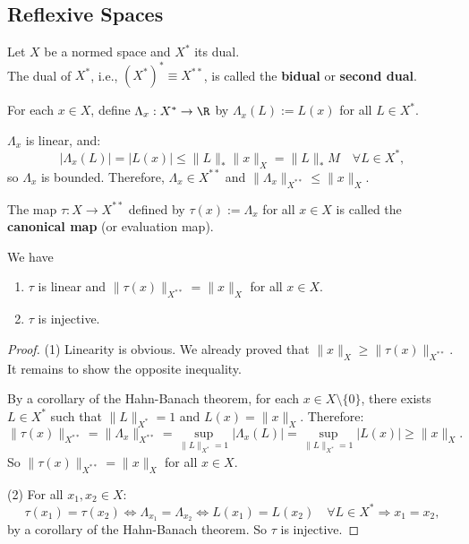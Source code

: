 \subsection{Reflexive Spaces}

\begin{definition}
Let $X$ be a normed space and $X^*$ its dual.\\The dual of $X^*$, i.e., $(X^*)^* \equiv X^{**}$, is called the \textbf{bidual} or \textbf{second dual}.

For each $x \in X$, define $\Lambda_x : X^* \to \R$ by $\Lambda_x(L) := L(x)$ for all $L \in X^*$.

$\Lambda_x$ is linear, and:
\[
|\Lambda_x(L)| = |L(x)| \leq \|L\|_* \|x\|_X = \|L\|_* M \quad \forall L \in X^*,
\]
so $\Lambda_x$ is bounded. Therefore, $\Lambda_x \in X^{**}$ and $\|\Lambda_x\|_{X^{**}} \leq \|x\|_X$.
\end{definition}

\begin{definition}
The map $\tau : X \to X^{**}$ defined by $\tau(x) := \Lambda_x$ for all $x \in X$ is called the \textbf{canonical map} (or evaluation map).
\end{definition}

\clearpage
\begin{theorem} We have

\begin{enumerate}
\item $\tau$ is linear and $\|\tau(x)\|_{X^{**}} = \|x\|_X$ for all $x \in X$.
\item $\tau$ is injective.
\end{enumerate}
\end{theorem}

\begin{proof}
(1) Linearity is obvious. We already proved that $\|x\|_X \geq \|\tau(x)\|_{X^{**}}$. It remains to show the opposite inequality.

By a corollary of the Hahn-Banach theorem, for each $x \in X \setminus \{0\}$, there exists $L \in X^*$ such that $\|L\|_{X^*} = 1$ and $L(x) = \|x\|_X$. Therefore:
\[
\|\tau(x)\|_{X^{**}} = \|\Lambda_x\|_{X^{**}} = \sup_{\|L\|_{X^*} = 1} |\Lambda_x(L)| = \sup_{\|L\|_{X^*} = 1} |L(x)| \geq \|x\|_X.
\]
So $\|\tau(x)\|_{X^{**}} = \|x\|_X$ for all $x \in X$.

(2) For all $x_1, x_2 \in X$:
\[
\tau(x_1) = \tau(x_2) \Leftrightarrow \Lambda_{x_1} = \Lambda_{x_2} \Leftrightarrow L(x_1) = L(x_2) \quad \forall L \in X^* \Rightarrow x_1 = x_2,
\]
by a corollary of the Hahn-Banach theorem. So $\tau$ is injective.
\end{proof}

